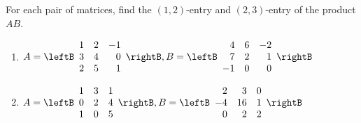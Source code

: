 \begin{enumialphparenastyle}

\begin{ex} For each pair of matrices, find the $(1,2)$-entry and $(2,3)$-entry of the product $AB$.
\begin{enumerate}  
\item 
$A = \leftB \begin{array}{rrr}
1 & 2 & -1 \\
3 & 4 & 0 \\
2 & 5 & 1 
\end{array} \rightB, B = \leftB \begin{array}{rrr}
4 & 6 & -2 \\
7 & 2 & 1 \\
-1 & 0 & 0 
\end{array} \rightB$
\item 
$A = \leftB \begin{array}{rrr}
1 & 3 & 1 \\
0 & 2 & 4 \\
1 & 0 & 5 
\end{array} \rightB, B = \leftB \begin{array}{rrr}
2 & 3 & 0 \\
-4 & 16 & 1 \\
0 & 2 & 2
\end{array} \rightB$
\end{enumerate} 
\end{ex}

\end{enumialphparenastyle}